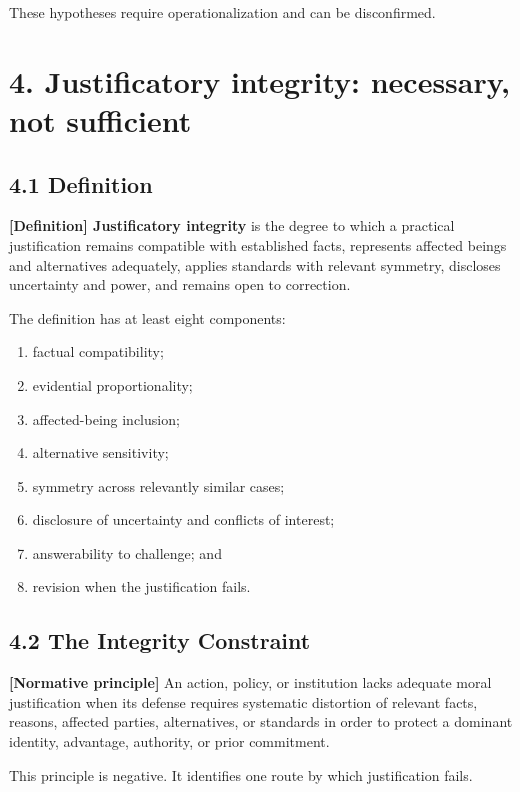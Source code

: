 \documentclass[
  11pt,
]{article}
\providecommand{\tightlist}{%
  \setlength{\itemsep}{0pt}\setlength{\parskip}{0pt}}
\begin{document}
These hypotheses require operationalization and can be disconfirmed.

\section{4. Justificatory integrity: necessary, not
sufficient}\label{justificatory-integrity-necessary-not-sufficient}

\subsection{4.1 Definition}\label{definition}

\textbf{{[}Definition{]} Justificatory integrity} is the degree to which
a practical justification remains compatible with established facts,
represents affected beings and alternatives adequately, applies
standards with relevant symmetry, discloses uncertainty and power, and
remains open to correction.

The definition has at least eight components:

\begin{enumerate}
\def\labelenumi{\arabic{enumi}.}
\tightlist
\item
  factual compatibility;
\item
  evidential proportionality;
\item
  affected-being inclusion;
\item
  alternative sensitivity;
\item
  symmetry across relevantly similar cases;
\item
  disclosure of uncertainty and conflicts of interest;
\item
  answerability to challenge; and
\item
  revision when the justification fails.
\end{enumerate}

\subsection{4.2 The Integrity
Constraint}\label{the-integrity-constraint}

\textbf{{[}Normative principle{]}} An action, policy, or institution
lacks adequate moral justification when its defense requires systematic
distortion of relevant facts, reasons, affected parties, alternatives,
or standards in order to protect a dominant identity, advantage,
authority, or prior commitment.

This principle is negative. It identifies one route by which
justification fails.
\end{document}
